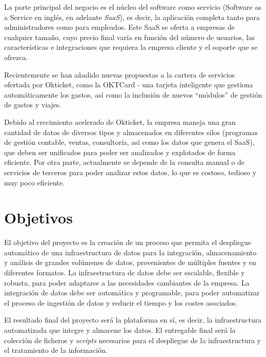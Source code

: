 La parte principal del negocio es el núcleo del software como servicio (Software
as a Service en inglés, en adelante \textit{SaaS}), es decir, la aplicación
completa tanto para administradores como para empleados. Este SaaS se oferta a
empresas de cualquier tamaño, cuyo precio final varía en función del número de
usuarios, las características e integraciones que requiera la empresa cliente y
el soporte que se ofrezca.

Recientemente se han añadido nuevas propuestas a la cartera de servicios
ofertada por Okticket, como la OKTCard {-} una tarjeta inteligente que gestiona
automáticamente los gastos, así como la inclusión de nuevos ``módulos'' de
gestión de gastos y viajes.

Debido al crecimiento acelerado de Okticket, la empresa maneja una gran cantidad
de datos de diversos tipos y almacenados en diferentes silos (programas de
gestión contable, ventas, consultoría, así como los datos que genera el SaaS),
que deben ser unificados para poder ser analizados y explotados de forma eficiente.
Por otra parte, actualmente se depende de la consulta manual o de servicios de
terceros para poder analizar estos datos, lo que es costoso, tedioso y muy
poco eficiente.

\section{Objetivos}\label{sec:objetivos}
El objetivo del proyecto es la creación de un proceso que permita el despliegue
automático de una infraestructura de datos para la integración, almacenamiento y
análisis de grandes volúmenes de datos, provenientes de múltiples fuentes y en
diferentes formatos. La infraestructura de datos debe ser escalable, flexible y
robusta, para poder adaptarse a las necesidades cambiantes de la empresa. La
integración de datos debe ser automática y programable, para poder automatizar
el proceso de ingestión de datos y reducir el tiempo y los costes asociados.

El resultado final del proyecto será la plataforma en sí, es decir, la
infraestructura automatizada que integre y almacene los datos. El entregable
final será la colección de ficheros y \textit{scripts} necesarios para el
despliegue de la infraestructura y el tratamiento de la información.
